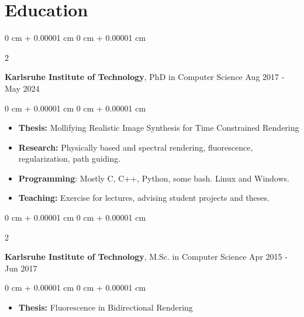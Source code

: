 \documentclass[10pt, letterpaper]{article}
\newenvironment{highlights}{
    \begin{itemize}[
        topsep=0.10 cm,
        parsep=0.10 cm,
        partopsep=0pt,
        itemsep=0pt,
        leftmargin=0 cm + 10pt
    ]
}{
    \end{itemize}
} %
\newenvironment{onecolentry}{
    \begin{adjustwidth}{
        0 cm + 0.00001 cm
    }{
        0 cm + 0.00001 cm
    }
}{
    \end{adjustwidth}
} %
\newenvironment{twocolentry}[2][]{
    \onecolentry
    \def\secondColumn{#2}
    \setcolumnwidth{\fill, 4.5 cm}
    \begin{paracol}{2}
}{
    \switchcolumn \raggedleft \secondColumn
    \end{paracol}
    \endonecolentry
} %
\begin{document}
\vspace{.5cm}
    \section{Education} 

    \newcommand{\expspace}{\vspace{.25cm}}
\newcommand{\educspace}{\expspace} 
\newcommand{\sectspacetop}{\vspace{.1cm}}
\sectspacetop
        \begin{twocolentry}{
            Aug 2017 - May 2024
        }
            \textbf{Karlsruhe Institute of Technology}, PhD in Computer Science\end{twocolentry}

        \vspace{0.10 cm}
        \begin{onecolentry}
            \begin{highlights}
            \item \textbf{Thesis:} Mollifying Realistic Image Synthesis for Time Constrained Rendering
                \item \textbf{Research:} Physically based and spectral rendering, fluorescence, regularization, path guiding.
                \item \textbf{Programming}: Mostly C, C++, Python, some bash. Linux and Windows.
                \item \textbf{Teaching:} Exercise for lectures, advising student projects and theses.
            \end{highlights}
        \end{onecolentry}

        \educspace

        \begin{twocolentry}{
            Apr 2015 - Jun 2017
        }
            \textbf{Karlsruhe Institute of Technology}, M.Sc. in Computer Science\end{twocolentry}

        \vspace{0.10 cm}
        \begin{onecolentry}
            \begin{highlights}
            \item \textbf{Thesis:} Fluorescence in Bidirectional Rendering
            \end{highlights}
        \end{onecolentry}
\end{document}
